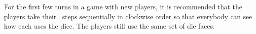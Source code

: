 For the first few turns in a game with new players, it is recommended that the 
players take their \development\ steps sequentially in clockwise order so that 
everybody can see how each uses the dice.  The players still use the same set of
die faces.
